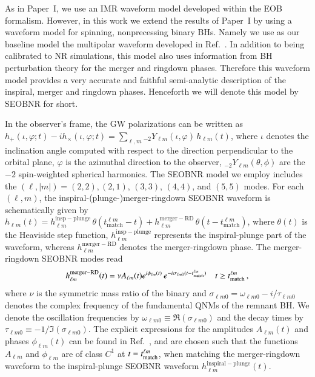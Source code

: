 \documentclass[twocolumn,prd,superscriptaddress,amsfonts,amssymb,amsmath,preprintnumbers]{revtex4-1}
\newcommand{\paperone}{Paper~I\xspace}
\begin{document}
As in \paperone, we use an IMR waveform model developed within the EOB formalism. However, in this work we extend the results of \paperone by using a waveform model for spinning, nonprecessing binary BHs. Namely we use as our baseline model the multipolar waveform developed in Ref.~\citep{Cotesta:2018fcv}. In addition to being calibrated to NR simulations, this model also uses information from BH perturbation theory for the merger and ringdown phases. Therefore this waveform model provides a very accurate and faithful semi-analytic description of the inspiral, merger and ringdown phases. Henceforth we will denote this model by SEOBNR for short.


In the observer's frame, the GW polarizations can be written as 
$h_+(\iota,\varphi;t ) - i h_\times(\iota,\varphi;t) = \sum_{\ell, m} {}_{-\!2}Y_{\ell m}(\iota,\varphi)\, h_{\ell m}(t)$, where $\iota$ denotes the inclination angle computed with respect to the direction perpendicular to the orbital plane, $\varphi$ is the azimuthal direction to the observer, ${}_{-\!2}Y_{\ell m}(\theta,\phi)$ are the $-2$ spin-weighted spherical harmonics. The SEOBNR model we employ includes the $(\ell, |m|)=(2,2),(2,1)$, $(3,3)$, $(4,4)$, and $(5,5)$ modes. For each $(\ell, m)$, the inspiral-(plunge-)merger-ringdown SEOBNR waveform is schematically given by $h_{\ell m}(t) = h_{\ell m}^\mathrm{insp-plunge}\, \theta(t_\mathrm{match}^{\ell m} - t) + h_{\ell m}^\mathrm{merger-RD}\,\theta(t-t_\mathrm{
    match}^{\ell m})$, where $\theta(t)$ is the Heaviside step function, $h_{\ell m}^\mathrm{insp-plunge}$ represents the inspiral-plunge part of the waveform, whereas $h_{\ell m}^\mathrm{merger-RD}$ denotes the merger-ringdown phase. 
The merger-ringdown SEOBNR modes read~\citep{Bohe:2016gbl,Cotesta:2018fcv}
%
\begin{equation}
  \label{RD}
  h_{\ell m}^\mathrm{merger-RD}(t) = \nu A_{\ell m}(t) e^{i\phi_{\ell m} (t)}\,
  e^{-i\sigma_{\ell m0} (t-t_\mathrm{match}^{\ell m})} \quad t \geq t_{\rm match}^{\ell m}\,,
\end{equation}
%
where $\nu$ is the symmetric mass ratio of the binary and $\sigma_{\ell m0} = \omega_{\ell m 0} -i/\tau_{\ell m 0}$ denotes the complex frequency of the fundamental QNMs of the remnant BH. We denote the oscillation frequencies by $\omega_{\ell m  0}\equiv \Re(\sigma_{\ell m0})$ and the decay times by $\tau_{\ell m 0}\equiv -1/\Im(\sigma_{\ell m0})$. The explicit expressions for the amplitudes $A_{\ell m}(t)$ and phases $\phi_{\ell m} (t)$ can be found in Ref.~\citep{Cotesta:2018fcv}, and are chosen such that the functions $A_{\ell  m}$ and $\phi_{\ell  m}$ are of class $C^1$ at $t=  t_{\rm match}^{\ell m}$, when matching the merger-ringdown waveform to the inspiral-plunge SEOBNR waveform $h_{\ell m}^\mathrm{inspiral-plunge}(t)$.
 
\end{document}
